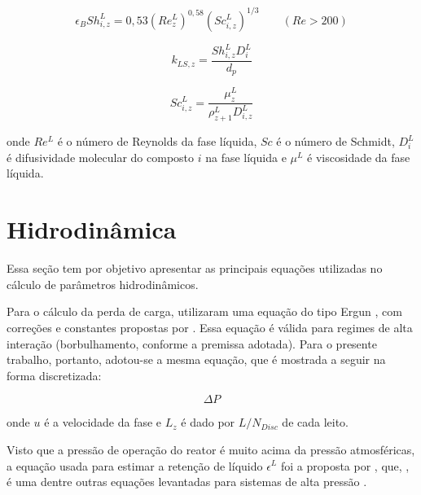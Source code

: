 \begin{equation}
\epsilon_BSh^L_{i,z} = 0,53(Re^L_z)^{0,58}(Sc^L_{i,z})^{1/3} \qquad (Re>200)
\label{eq:Sh2}
\end{equation}

\begin{equation}
k_{LS,z} = \dfrac{Sh^L_{i,z}D^L_{i}}{d_p}
\label{eq:kLS}
\end{equation}

\begin{equation} 
Sc^L_{i,z} = \dfrac{\mu^L_{z}}{\rho^L_{z+1}D^L_{i,z}}
\label{eq:Sc}
\end{equation}

onde $Re^L$ é o número de Reynolds da fase líquida, $Sc$ é o número de Schmidt,
$D^L_{i}$ é difusividade molecular do composto $i$ na fase líquida e $\mu^L$ é
viscosidade da fase líquida.


\section{Hidrodinâmica} \label{sec:hidrodinamica3}

Essa seção tem por objetivo apresentar as principais equações utilizadas no
cálculo de parâmetros hidrodinâmicos.

Para o cálculo da perda de carga,  utilizaram uma equação
do tipo Ergun , com correções e constantes propostas
por . Essa equação é válida para regimes de alta
interação (borbulhamento, conforme a premissa adotada). Para o presente
trabalho, portanto, adotou-se a mesma equação, que é mostrada a seguir na forma
discretizada:

\begin{equation}
\Delta P
\label{eq:deltaP}
\end{equation}

onde $u$ é a velocidade da fase e $L_z$ é dado por $L/N_{Disc}$ de cada leito.


Visto que a pressão de operação do reator é muito acima da pressão atmosféricas,
a equação usada para estimar a retenção de líquido $\epsilon^L$ foi a proposta
por , que, , é uma dentre outras
equações levantadas para sistemas de alta pressão \cite{Ancheyta2011}.

